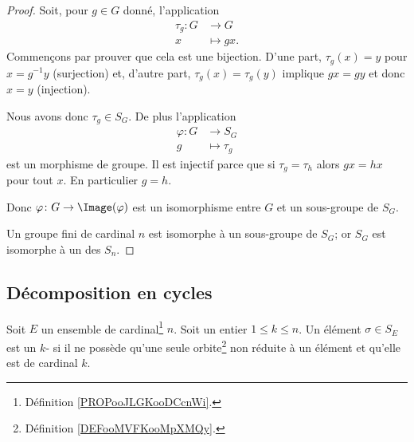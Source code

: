 \begin{proof}
	Soit, pour \( g\in G\) donné, l'application
	\begin{equation}
		\begin{aligned}
			\tau_g\colon G & \to G       \\
			x              & \mapsto gx.
		\end{aligned}
	\end{equation}
	Commençons par prouver que cela est une bijection.  D'une part, \( \tau_g(x)=y\) pour \( x=g^{-1} y\) (surjection) et, d'autre part, \( \tau_g(x)=\tau_g(y)\) implique \( gx=gy\) et donc \( x=y\) (injection).

	Nous avons donc \( \tau_g\in S_G\). De plus l'application
	\begin{equation}
		\begin{aligned}
			\varphi\colon G & \to S_G        \\
			g               & \mapsto \tau_g
		\end{aligned}
	\end{equation}
	est un morphisme de groupe. Il est injectif parce que si \( \tau_g=\tau_h\) alors \( gx=hx\) pour tout \( x\). En particulier \( g=h\).

	Donc \( \varphi\colon G\to \Image(\varphi)\) est un isomorphisme entre \( G\) et un sous-groupe de \( S_G\).

	Un groupe fini de cardinal \( n\) est isomorphe à un sous-groupe de \( S_G\); or \( S_G\) est isomorphe à un des \( S_n\).
\end{proof}


\subsection{Décomposition en cycles}

\begin{definition}
	Soit \( E\) un ensemble de cardinal\footnote{Définition \ref{PROPooJLGKooDCcnWi}.} \( n\). Soit un entier \( 1\leq k\leq n\). Un élément \( \sigma\in S_E\) est un \( k\)- si il ne possède qu'une seule orbite\footnote{Définition \ref{DEFooMVFKooMpXMQy}.} non réduite à un élément et qu'elle est de cardinal \( k\).
\end{definition}

